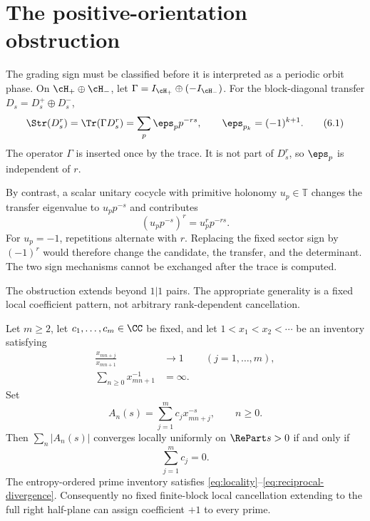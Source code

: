 \section{The positive-orientation obstruction}
\label{sec:orientation}

The grading sign must be classified before it is interpreted as a periodic
orbit phase.  On $\cH_+\oplus\cH_-$, let
$\Gamma=I_{\cH_+}\oplus(-I_{\cH_-})$.  For the block-diagonal transfer
$D_s=D_s^+\oplus D_s^-$,
\[
 \Str(D_s^r)=\Tr(\Gamma D_s^r)
 =\sum_p\eps_p p^{-rs},\qquad
 \eps_{p_k}=(-1)^{k+1}.                         \tag{6.1}
\]
The operator $\Gamma$ is inserted once by the trace.  It is not part of
$D_s^r$, so $\eps_p$ is independent of $r$.

By contrast, a scalar unitary cocycle with primitive holonomy $u_p\in\mathbb T$
changes the transfer eigenvalue to $u_pp^{-s}$ and contributes
\[
 (u_pp^{-s})^r=u_p^r p^{-rs}.                   \tag{6.2}
\]
For $u_p=-1$, repetitions alternate with $r$.  Replacing the fixed sector
sign by $(-1)^r$ would therefore change the candidate, the transfer, and the
determinant.  The two sign mechanisms cannot be exchanged after the trace is
computed.

The obstruction extends beyond $1|1$ pairs.  The appropriate generality is a
fixed local coefficient pattern, not arbitrary rank-dependent cancellation.

\begin{theorem}
\label{thm:block-rigidity}
Let $m\ge2$, let $c_1,\ldots,c_m\in\CC$ be fixed, and let
$1<x_1<x_2<\cdots$ be an inventory satisfying
\begin{align}
 \frac{x_{mn+j}}{x_{mn+1}}&\longrightarrow1
       &&(j=1,\ldots,m),                       \tag{6.3}\label{eq:locality}\\
 \sum_{n\ge0}x_{mn+1}^{-1}&=\infty.            \tag{6.4}\label{eq:reciprocal-divergence}
\end{align}
Set
\[
 A_n(s)=\sum_{j=1}^m c_jx_{mn+j}^{-s},
 \qquad n\ge0.                                \tag{6.5}
\]
Then $\sum_n|A_n(s)|$ converges locally uniformly on $\RePart s>0$ if and
only if
\[
 \sum_{j=1}^m c_j=0.                           \tag{6.6}
\]
The entropy-ordered prime inventory satisfies \eqref{eq:locality}--\eqref{eq:reciprocal-divergence}.
Consequently no fixed finite-block local cancellation extending to the full
right half-plane can assign coefficient $+1$ to every prime.
\end{theorem}

